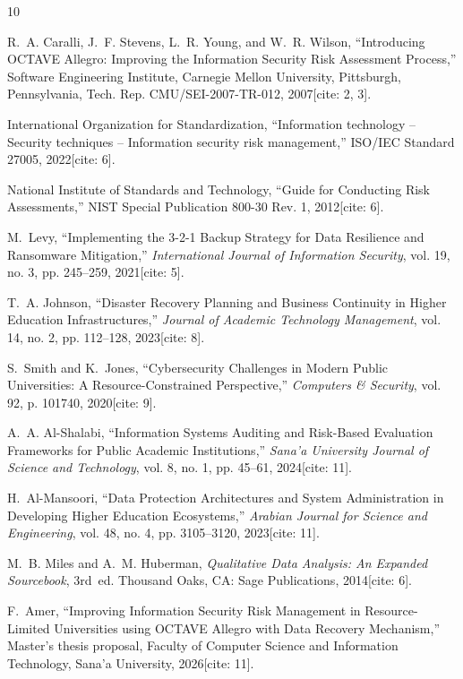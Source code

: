 \documentclass[journal,onecolumn,12pt,twoside]{IEEEtran}
\begin{document}
	\begin{thebibliography}{10}
		
		R.~A. Caralli, J.~F. Stevens, L.~R. Young, and W.~R. Wilson, ``Introducing OCTAVE Allegro: Improving the Information Security Risk Assessment Process,'' Software Engineering Institute, Carnegie Mellon University, Pittsburgh, Pennsylvania, Tech. Rep. CMU/SEI-2007-TR-012, 2007[cite: 2, 3].
		
		International Organization for Standardization, ``Information technology -- Security techniques -- Information security risk management,'' ISO/IEC Standard 27005, 2022[cite: 6].
		
		National Institute of Standards and Technology, ``Guide for Conducting Risk Assessments,'' NIST Special Publication 800-30 Rev. 1, 2012[cite: 6].
		
		M.~Levy, ``Implementing the 3-2-1 Backup Strategy for Data Resilience and Ransomware Mitigation,'' \emph{International Journal of Information Security}, vol. 19, no. 3, pp. 245--259, 2021[cite: 5].
		
		T.~A. Johnson, ``Disaster Recovery Planning and Business Continuity in Higher Education Infrastructures,'' \emph{Journal of Academic Technology Management}, vol. 14, no. 2, pp. 112--128, 2023[cite: 8].
		
		S.~Smith and K.~Jones, ``Cybersecurity Challenges in Modern Public Universities: A Resource-Constrained Perspective,'' \emph{Computers \& Security}, vol. 92, p. 101740, 2020[cite: 9].
		
		A.~A. Al-Shalabi, ``Information Systems Auditing and Risk-Based Evaluation Frameworks for Public Academic Institutions,'' \emph{Sana'a University Journal of Science and Technology}, vol. 8, no. 1, pp. 45--61, 2024[cite: 11].
		
		H.~Al-Mansoori, ``Data Protection Architectures and System Administration in Developing Higher Education Ecosystems,'' \emph{Arabian Journal for Science and Engineering}, vol. 48, no. 4, pp. 3105--3120, 2023[cite: 11].
		
		M.~B. Miles and A.~M. Huberman, \emph{Qualitative Data Analysis: An Expanded Sourcebook}, 3rd~ed. Thousand Oaks, CA: Sage Publications, 2014[cite: 6].
		
		F.~Amer, ``Improving Information Security Risk Management in Resource-Limited Universities using OCTAVE Allegro with Data Recovery Mechanism,'' Master's thesis proposal, Faculty of Computer Science and Information Technology, Sana'a University, 2026[cite: 11].
		
	\end{thebibliography}
	
\end{document}
